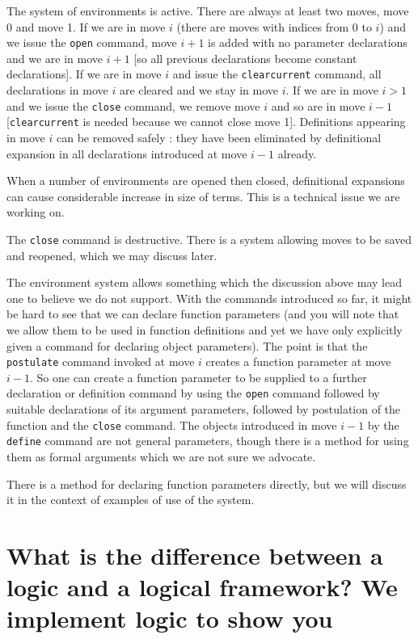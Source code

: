 \documentclass[12pt]{article}
\begin{document}
The system of environments is active.  There are always at least two moves, move 0 and move 1.  If we are in move $i$ (there are moves with indices from 0 to $i$) and we issue the {\tt open} command,
move $i+1$ is added with no parameter declarations and we are in move $i+1$ [so all previous declarations become constant declarations].  If we are in move $i$ and issue the {\tt clearcurrent} command, all declarations in move $i$ are cleared and we stay in move $i$.  If we are in move $i>1$ and we issue the {\tt close} command, we remove move $i$ and so are in move $i-1$ [{\tt clearcurrent} is needed because we cannot close move 1].  Definitions appearing in move $i$ can be removed safely :  they have been eliminated by definitional expansion in all declarations introduced at move $i-1$ already. 

When a number of environments are opened then closed, definitional expansions can cause considerable increase in size of terms.  This is a technical issue we are working on.

The {\tt close} command is destructive.  There is a system allowing moves to be saved and reopened, which we may discuss later.

The environment system allows something which the discussion above may lead one to believe we do not support.  With the commands introduced so far, it might be hard to see that we can declare function parameters (and you will note that we allow them to be used in function definitions and yet we have only explicitly given a command for declaring object parameters).  The point is that the {\tt postulate} command invoked at move $i$ creates a function parameter 
at move $i-1$.  So one can create a function parameter to be supplied to a further declaration or definition command by using the {\tt open} command followed by suitable declarations of its argument parameters, followed by postulation of the function  and the {\tt close} command.  The objects introduced in move $i-1$ by the {\tt define} command are not general parameters, though there is a method for using them as formal arguments which we are not sure we advocate.

There is a method for declaring function parameters directly, but we will discuss it in the context of examples of use of the system.

\section{What is the difference between a logic and a logical framework?  We implement logic to show you}
\end{document}
